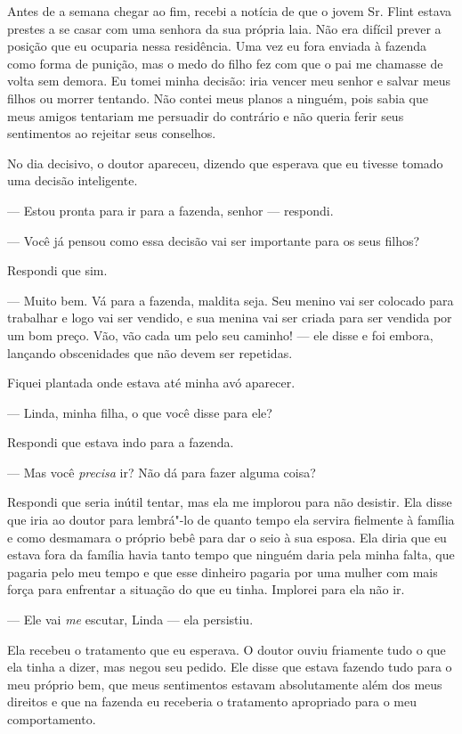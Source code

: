 Antes de a semana chegar ao fim, recebi
a notícia de que o jovem Sr. Flint estava prestes a se casar com uma
senhora da sua própria laia. Não era difícil prever a posição que eu
ocuparia nessa residência. Uma vez eu fora enviada à fazenda como forma
de punição, mas o medo do filho fez com que o pai me chamasse de volta
sem demora. Eu tomei minha decisão: iria vencer meu senhor e salvar meus
filhos ou morrer tentando. Não contei meus planos a ninguém, pois sabia
que meus amigos tentariam me persuadir do contrário e não queria ferir
seus sentimentos ao rejeitar seus conselhos.

No dia decisivo, o doutor apareceu,
dizendo que esperava que eu tivesse tomado uma decisão inteligente.

--- Estou pronta para ir para a
fazenda, senhor --- respondi.

--- Você já pensou como essa decisão
vai ser importante para os seus filhos?

Respondi que sim.

--- Muito bem. Vá para a fazenda,
maldita seja. Seu menino vai ser colocado para trabalhar e logo vai ser
vendido, e sua menina vai ser criada para ser vendida por um bom preço.
Vão, vão cada um pelo seu caminho! --- ele disse e foi embora, lançando
obscenidades que não devem ser repetidas.

Fiquei plantada onde estava até minha
avó aparecer.

--- Linda, minha filha, o que você disse para ele?

Respondi que estava indo para a
fazenda.

--- Mas você \emph{precisa} ir? Não dá
para fazer alguma coisa?

Respondi que seria inútil tentar, mas
ela me implorou para não desistir. Ela disse que iria ao doutor para
lembrá"-lo de quanto tempo ela servira fielmente à família e como
desmamara o próprio bebê para dar o seio à sua esposa. Ela diria que eu
estava fora da família havia tanto tempo que ninguém daria pela minha
falta, que pagaria pelo meu tempo e que esse dinheiro pagaria por uma
mulher com mais força para enfrentar a situação do que eu tinha.
Implorei para ela não ir.

--- Ele vai \emph{me} escutar, Linda --- ela persistiu.

Ela recebeu o tratamento que eu esperava. O doutor ouviu friamente tudo
o que ela tinha a dizer, mas negou seu pedido. Ele disse que estava
fazendo tudo para o meu próprio bem, que meus sentimentos estavam
absolutamente além dos meus direitos e que na fazenda eu receberia o
tratamento apropriado para o meu comportamento.

